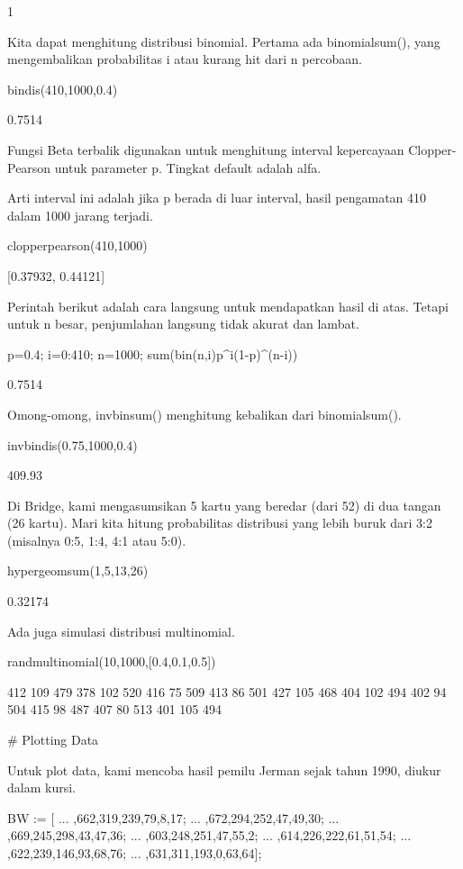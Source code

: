 \documentclass{article}
\begin{document}
    1

Kita dapat menghitung distribusi binomial. Pertama ada binomialsum(),
yang mengembalikan probabilitas i atau kurang hit dari n percobaan.


\>bindis(410,1000,0.4)


    0.7514

Fungsi Beta terbalik digunakan untuk menghitung interval kepercayaan
Clopper-Pearson untuk parameter p. Tingkat default adalah alfa.


Arti interval ini adalah jika p berada di luar interval, hasil
pengamatan 410 dalam 1000 jarang terjadi.


\>clopperpearson(410,1000)


    [0.37932,  0.44121]

Perintah berikut adalah cara langsung untuk mendapatkan hasil di atas.
Tetapi untuk n besar, penjumlahan langsung tidak akurat dan lambat.


\>p=0.4; i=0:410; n=1000; sum(bin(n,i)\*p^i\*(1-p)^(n-i))


    0.7514

Omong-omong, invbinsum() menghitung kebalikan dari binomialsum().


\>invbindis(0.75,1000,0.4)


    409.93

Di Bridge, kami mengasumsikan 5 kartu yang beredar (dari 52) di dua
tangan (26 kartu). Mari kita hitung probabilitas distribusi yang lebih
buruk dari 3:2 (misalnya 0:5, 1:4, 4:1 atau 5:0).


\*hypergeomsum(1,5,13,26)


    0.32174

Ada juga simulasi distribusi multinomial.


\>randmultinomial(10,1000,[0.4,0.1,0.5])


          412       109       479 
          378       102       520 
          416        75       509 
          413        86       501 
          427       105       468 
          404       102       494 
          402        94       504 
          415        98       487 
          407        80       513 
          401       105       494 

# Plotting Data

Untuk plot data, kami mencoba hasil pemilu Jerman sejak tahun 1990,
diukur dalam kursi.


\>BW := [ ...  
,662,319,239,79,8,17; ...  
,672,294,252,47,49,30; ...  
,669,245,298,43,47,36; ...  
,603,248,251,47,55,2; ...  
,614,226,222,61,51,54; ...  
,622,239,146,93,68,76; ...  
,631,311,193,0,63,64];
\end{document}

